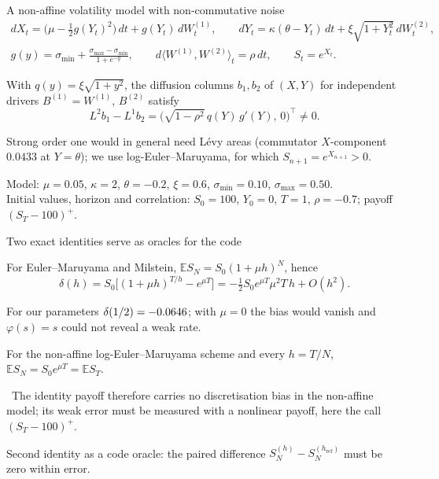 \documentclass[aspectratio=169,10pt,t]{beamer}
\newcommand{\E}{\mathbb{E}}
\begin{document}
\begin{frame}{A non-affine volatility model with non-commutative noise}
\bodytop\vspace{1.8mm}\vspace{-\abovedisplayskip}\vspace{-\baselineskip}
\begin{gather*}
dX_t=\bigl(\mu-\tfrac12g(Y_t)^2\bigr)\,dt+g(Y_t)\,dW^{(1)}_t,\qquad
dY_t=\kappa(\theta-Y_t)\,dt+\xi\sqrt{1+Y_t^2}\,dW^{(2)}_t,\\[0.2em]
g(y)=\sigma_{\min}+\frac{\sigma_{\max}-\sigma_{\min}}{1+e^{-y}},\qquad d\langle W^{(1)},W^{(2)}\rangle_t=\rho\,dt,\qquad S_t=e^{X_t}.
\end{gather*}
\begin{proposition*}
With $q(y)=\xi\sqrt{1+y^2}$, the diffusion columns $b_1,b_2$ of $(X,Y)$ for independent drivers $B^{(1)}=W^{(1)}$, $B^{(2)}$ satisfy
\[
L^2b_1-L^1b_2=\bigl(\sqrt{1-\rho^2}\,q(Y)\,g'(Y),\,0\bigr)^{\!\top}\neq0.
\]
\end{proposition*}
Strong order one would in general need L\'evy areas (commutator $X$-component $0.0433$ at $Y=\theta$); we use
log-Euler--Maruyama, for which $S_{n+1}=e^{X_{n+1}}>0$.
\closing{Model: $\mu=0.05$, $\kappa=2$, $\theta=-0.2$, $\xi=0.6$, $\sigma_{\min}=0.10$, $\sigma_{\max}=0.50$.\\
Initial values, horizon and correlation: $S_0=100$, $Y_0=0$, $T=1$, $\rho=-0.7$; payoff $(S_T-100)^+$.}
\end{frame}

\begin{frame}{Two exact identities serve as oracles for the code}
\bodytop\vspace{-0.6mm}
\begin{proposition*}
For Euler--Maruyama and Milstein, $\E S_N=S_0(1+\mu h)^N$, hence
\[
\delta(h)=S_0\bigl[(1+\mu h)^{T/h}-e^{\mu T}\bigr]=-\tfrac12S_0e^{\mu T}\mu^2T\,h+O(h^2).
\]
\end{proposition*}
For our parameters $\delta(1/2)=-0.0646$; with $\mu=0$ the bias would vanish and $\varphi(s)=s$ could not reveal a
weak rate.%
\par\vspace{0.85em}
\begin{proposition*}
For the non-affine log-Euler--Maruyama scheme and every $h=T/N$, \ $\E S_N=S_0e^{\mu T}=\E S_T$.
\end{proposition*}
\vspace{1.4em}
\noindent{}\ The identity payoff therefore carries no discretisation bias in the non-affine model; its weak error
must be measured with a nonlinear payoff, here the call $(S_T-100)^+$.
\closing{Second identity as a code oracle: the paired difference $S^{(h)}_N-S^{(h_{\mathrm{ref}})}_N$ must be zero within error.}%
\end{frame}
\end{document}
